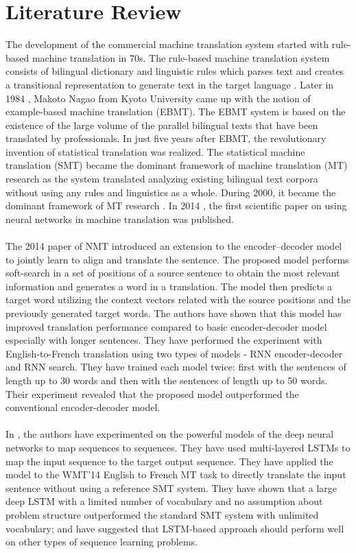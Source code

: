 \section{Literature Review}
The development of the commercial machine translation system started with rule-based machine translation in 70s. The rule-based machine translation system consists of bilingual dictionary and linguistic rules which parses text and creates a transitional representation to generate text in the target language \cite{freecodecamp.org_2018} \cite{systran}. Later in 1984 \cite{freecodecamp.org_2018}, Makoto Nagao from Kyoto University came up with the notion of example-based machine translation (EBMT). The EBMT system is based on the existence of the large volume of the parallel bilingual texts that have been translated by professionals. In just five years after EBMT, the revolutionary invention of statistical translation was realized. The statistical machine translation (SMT) became the dominant framework of machine translation (MT) research as the system translated analyzing existing bilingual text corpora without using any rules and linguistics as a whole. During 2000, it became the dominant framework of MT research \cite{freecodecamp.org_2018} \cite{hutchins2005history}. In 2014 \cite{freecodecamp.org_2018}, the first scientific paper on using neural networks in machine translation was published.
\\\\
The 2014 paper \cite{bahdanau2014neural} of NMT introduced an extension to the encoder–decoder model to jointly learn to align and translate the sentence. The proposed model performs soft-search in a set of positions of a source sentence to obtain the most relevant information and generates a word in a translation. The model then predicts a target word utilizing the context vectors related with the source positions and the previously generated target words. The authors have shown that this model has improved translation performance compared to basic encoder-decoder model especially with longer sentences. They have performed the experiment with English-to-French translation using two types of models - RNN encoder-decoder and RNN search. They have trained each model twice: first with the sentences of length up to 30 words and then with the sentences of length up to 50 words. Their experiment revealed that the proposed model outperformed the conventional encoder-decoder model.
\\\\
In \cite{sutskever2014sequence}, the authors have experimented on the powerful models of the deep neural networks to map sequences to sequences. They have used multi-layered LSTMs to map the input sequence to the target output sequence. They have applied the model to the WMT’14 English to French MT task to directly translate the input sentence without using a reference SMT system. They have shown that a large deep LSTM with a limited number of vocabulary and no assumption about problem structure outperformed the standard SMT system with unlimited vocabulary; and have suggested that LSTM-based approach should perform well on other types of sequence learning problems.
